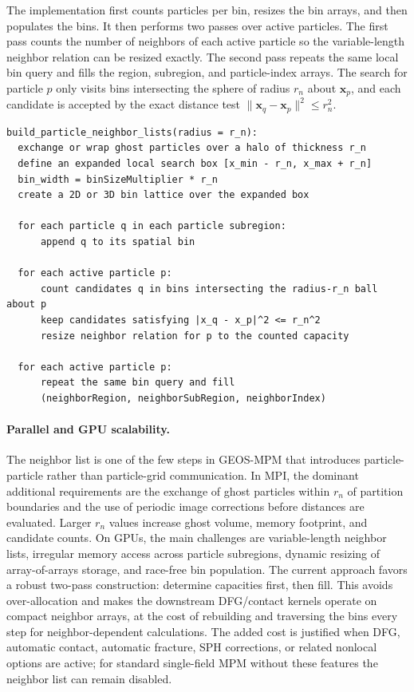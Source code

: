 The implementation first counts particles per bin, resizes the bin arrays, and then populates the bins.  It then performs two passes over active particles.  The first pass counts the number of neighbors of each active particle so the variable-length neighbor relation can be resized exactly.  The second pass repeats the same local bin query and fills the region, subregion, and particle-index arrays.  The search for particle $p$ only visits bins intersecting the sphere of radius $r_n$ about $\mathbf{x}_p$, and each candidate is accepted by the exact distance test $\|\mathbf{x}_q-\mathbf{x}_p\|^2\le r_n^2$.

\begin{lstlisting}[caption={Particle-neighbor list construction by radius-binning.},basicstyle=\ttfamily\small]
build_particle_neighbor_lists(radius = r_n):
  exchange or wrap ghost particles over a halo of thickness r_n
  define an expanded local search box [x_min - r_n, x_max + r_n]
  bin_width = binSizeMultiplier * r_n
  create a 2D or 3D bin lattice over the expanded box

  for each particle q in each particle subregion:
      append q to its spatial bin

  for each active particle p:
      count candidates q in bins intersecting the radius-r_n ball about p
      keep candidates satisfying |x_q - x_p|^2 <= r_n^2
      resize neighbor relation for p to the counted capacity

  for each active particle p:
      repeat the same bin query and fill
      (neighborRegion, neighborSubRegion, neighborIndex)
\end{lstlisting}

\paragraph{Parallel and GPU scalability.}
The neighbor list is one of the few steps in GEOS-MPM that introduces particle-particle rather than particle-grid communication.  In MPI, the dominant additional requirements are the exchange of ghost particles within $r_n$ of partition boundaries and the use of periodic image corrections before distances are evaluated.  Larger $r_n$ values increase ghost volume, memory footprint, and candidate counts.  On GPUs, the main challenges are variable-length neighbor lists, irregular memory access across particle subregions, dynamic resizing of array-of-arrays storage, and race-free bin population.  The current approach favors a robust two-pass construction: determine capacities first, then fill.  This avoids over-allocation and makes the downstream DFG/contact kernels operate on compact neighbor arrays, at the cost of rebuilding and traversing the bins every step for neighbor-dependent calculations.  The added cost is justified when DFG, automatic contact, automatic fracture, SPH corrections, or related nonlocal options are active; for standard single-field MPM without these features the neighbor list can remain disabled.

